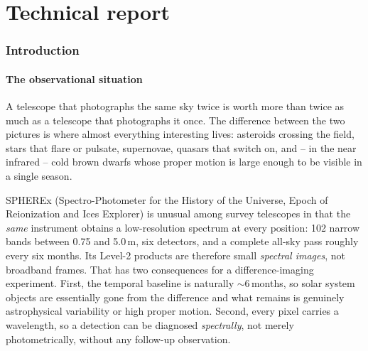 \documentclass[11pt,a4paper]{article}
\begin{document}
\tableofcontents
\newpage

\part{Technical report}\label{part:report}

\section{Introduction}
\label{sec:intro}

\subsection{The observational situation}

A telescope that photographs the same sky twice is worth more than twice as much as a telescope
that photographs it once. The difference between the two pictures is where almost everything
interesting lives: asteroids crossing the field, stars that flare or pulsate, supernovae, quasars
that switch on, and -- in the near infrared -- cold brown dwarfs whose proper motion is large
enough to be visible in a single season.

SPHEREx (Spectro-Photometer for the History of the Universe, Epoch of Reionization and Ices
Explorer) is unusual among survey telescopes in that the \emph{same} instrument obtains a
low-resolution spectrum at every position: 102 narrow bands between 0.75 and 5.0\,\textmu m,
six detectors, and a complete all-sky pass roughly every six months. Its Level-2 products are
therefore small \emph{spectral images}, not broadband frames. That has two consequences for a
difference-imaging experiment. First, the temporal baseline is naturally $\sim$6\,months, so solar
system objects are essentially gone from the difference and what remains is genuinely astrophysical
variability or high proper motion. Second, every pixel carries a wavelength, so a detection can be
diagnosed \emph{spectrally}, not merely photometrically, without any follow-up observation.
\end{document}
